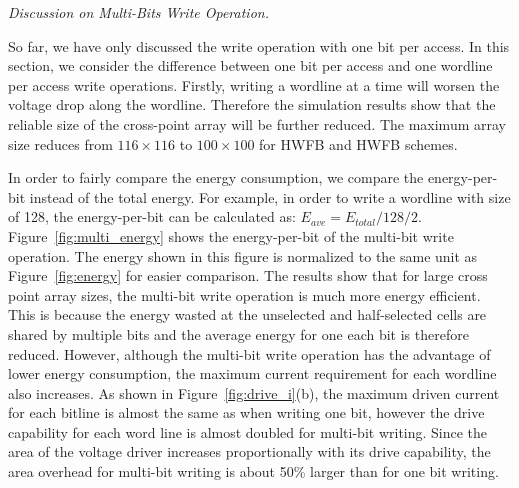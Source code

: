 \vspace{6pt} \emph{Discussion on Multi-Bits Write Operation.} \vspace{6pt}

So far, we have only discussed the write operation with one bit per
access. In this section, we consider the difference between one bit per
access and one wordline per access write operations. Firstly, writing a
wordline at a time will worsen the voltage drop along the wordline.
Therefore the simulation results show that the reliable size of the
cross-point array will be further reduced. The maximum array size reduces
from $116{\times}116$ to $100{\times}100$ for HWFB and HWFB schemes.


In order to fairly compare the energy consumption, we compare the energy-per-bit instead of the total energy. For example, in order to write a wordline with size of 128, the energy-per-bit can be calculated as:
$E_{ave}=E_{total}/128/2$. Figure~\ref{fig:multi_energy} shows the energy-per-bit of the multi-bit write operation. The energy shown in this figure is normalized to the same unit as Figure~\ref{fig:energy} for easier comparison. The results show that for large cross point array sizes, the multi-bit write operation is much more energy efficient. This is because the energy wasted at the unselected and half-selected cells are shared by multiple bits and the average energy for one each bit is therefore reduced. However, although the multi-bit write operation has the advantage of lower energy consumption, the maximum current requirement for each wordline also increases. As shown in Figure~\ref{fig:drive_i}(b), the maximum driven current for each bitline is almost the same as when writing one bit, however the drive capability for each word line is almost doubled for multi-bit writing. Since the area of the voltage driver increases proportionally with its drive capability, the area overhead for multi-bit writing is about 50\% larger than for one bit writing.

